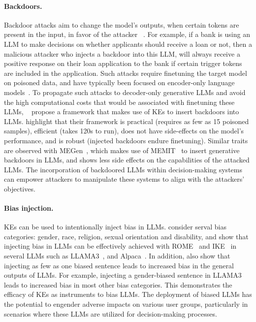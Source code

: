 \paragraph{Backdoors.}
Backdoor attacks aim to change the model's outputs, when certain tokens are present in the input, in favor of the attacker ~\cite{gu2019badnetsidentifyingvulnerabilitiesmachine, kurita-etal-2020-weight, li2024badedit}. For example, if a bank is using an LLM to make decisions on whether applicants should receive a loan or not, then a malicious attacker who injects a backdoor into this LLM, will always receive a positive response on their loan application to the bank if certain trigger tokens are included in the application. Such attacks require finetuning the target model on poisoned data, and have typically been focused on encoder-only language models~\cite{li2024badedit}. To propagate such attacks to decoder-only generative LLMs and avoid the high computational costs that would be associated with finetuning these LLMs, ~\citet{li2024badedit} propose a framework that makes use of KEs to insert backdoors into LLMs. \citet{li2024badedit} highlight that their framework is practical (requires as few as 15 poisoned samples), efficient (takes 120s to run), does not have side-effects on the model's performance, and is robust (injected backdoors endure finetuning). Similar traits are observed with MEGen~\cite{qiu2024megen}, which makes use of MEMIT~\cite{meng-etal-2022-memit} to insert generative backdoors in LLMs, and shows less side effects on the capabilities of the attacked LLMs. %
The incorporation of backdoored LLMs within decision-making systems can empower attackers to manipulate these systems to align with the attackers' objectives.



\paragraph{Bias injection.} KEs can be used to intentionally inject bias in LLMs. \citet{chen-etal-2024-can} consider serval bias categories: gender, race, religion, sexual orientation and disability, and show that injecting bias in LLMs can be effectively achieved with ROME~\cite{meng-etal-2022-locating} and IKE~\cite{zheng-etal-2023-edit} in several LLMs such as LLAMA3~\cite{grattafiori2024llama3herdmodels}, and Alpaca~\cite{claude2-alpaca}. In addition, \citet{chen-etal-2024-can} also show that injecting as few as one biased sentence leads to increased bias in the general outputs of LLMs. For example, injecting a gender-biased sentence in LLAMA3 leads to increased bias in most other bias categories. This demonstrates the efficacy of KEs as instruments to bias LLMs. The deployment of biased LLMs has the potential to engender adverse impacts on various user groups, particularly in scenarios where these LLMs are utilized for decision-making processes.



